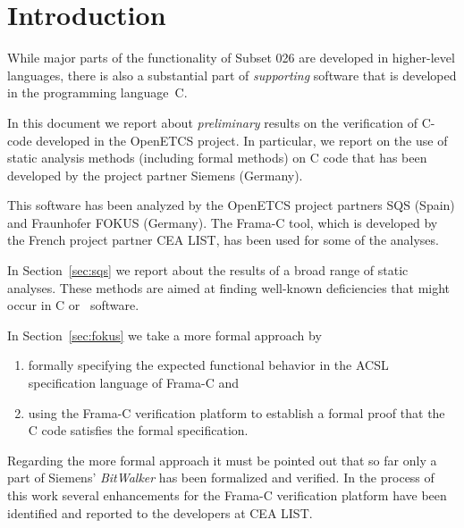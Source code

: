 
\section{Introduction}

While major parts of the functionality of {Subset 026} are developed in 
higher-level languages, there is also a substantial part of \emph{supporting} software
that is developed in the programming language~C.

In this document we report about \emph{preliminary} results on the verification
of C-code developed in the OpenETCS project.
In particular, we report on the use of static analysis methods (including formal methods)
on C code that has been developed by the project partner Siemens (Germany).

This software has been analyzed by the OpenETCS project partners SQS (Spain)
and Fraunhofer FOKUS (Germany).
The Frama-C tool, which is developed by the French project partner {CEA LIST},
has been used for some of the analyses.

In Section~\ref{sec:sqs} we report about the results of a broad range
of static analyses. 
These methods are aimed at finding well-known deficiencies that might occur in C or \CC\ software.

In Section~\ref{sec:fokus} we take a more formal approach by 
\begin{enumerate}
\item formally specifying the expected functional behavior in the ACSL specification language of {Frama-C}
      and
\item using the {Frama-C} verification platform to establish a formal proof that the C code
      satisfies the formal specification.
\end{enumerate}

Regarding the more formal approach it must be pointed out that so far only a 
part of Siemens' \emph{BitWalker} has been formalized and verified.
In the process of this work several enhancements for the Frama-C verification platform have 
been identified and reported to the developers at {CEA LIST}.




